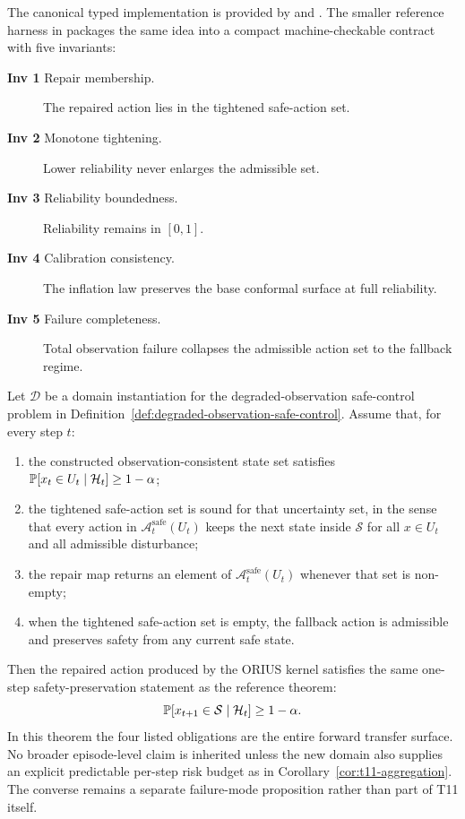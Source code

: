 The canonical typed implementation is provided by
 and
.  The smaller reference harness in
 packages the same idea into a compact
machine-checkable contract with five invariants:
\begin{description}
  \item[\textbf{Inv 1} Repair membership.] The repaired action lies in the
    tightened safe-action set.
  \item[\textbf{Inv 2} Monotone tightening.] Lower reliability never enlarges
    the admissible set.
  \item[\textbf{Inv 3} Reliability boundedness.] Reliability remains in
    $[0,1]$.
  \item[\textbf{Inv 4} Calibration consistency.] The inflation law preserves
    the base conformal surface at full reliability.
  \item[\textbf{Inv 5} Failure completeness.] Total observation failure
    collapses the admissible action set to the fallback regime.
\end{description}

\begin{theorem}
\label{thm:universality-completeness}
Let $\mathcal{D}$ be a domain instantiation for the degraded-observation
safe-control problem in Definition~\ref{def:degraded-observation-safe-control}.
Assume that, for every step $t$:
\begin{enumerate}
  \item the constructed observation-consistent state set satisfies
    $\operatorname{\mathbb{P}}[x_t \in U_t \mid \mathcal{H}_t] \ge 1-\alpha$;
  \item the tightened safe-action set is sound for that uncertainty set, in
    the sense that every action in $\mathcal{A}_t^{\mathrm{safe}}(U_t)$ keeps
    the next state inside $\mathcal{S}$ for all $x \in U_t$ and all
    admissible disturbance;
  \item the repair map returns an element of
    $\mathcal{A}_t^{\mathrm{safe}}(U_t)$ whenever that set is non-empty;
  \item when the tightened safe-action set is empty, the fallback action is
    admissible and preserves safety from any current safe state.
\end{enumerate}
Then the repaired action produced by the ORIUS kernel satisfies the same
one-step safety-preservation statement as the reference theorem:
\[
  \operatorname{\mathbb{P}}[x_{t+1}\in\mathcal{S}\mid \mathcal{H}_t] \ge 1-\alpha.
\]
\noindent In this theorem the four listed obligations are the entire forward
transfer surface.  No broader episode-level claim is inherited unless the new
domain also supplies an explicit predictable per-step risk budget as in
Corollary~\ref{cor:t11-aggregation}.  The converse remains a separate
failure-mode proposition rather than part of T11 itself.
\end{theorem}

